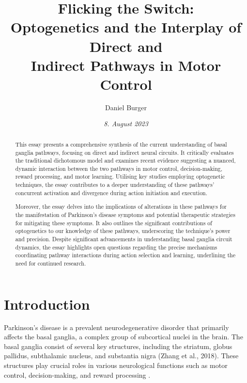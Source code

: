 \documentclass[10pt]{article}
\title{\textbf{Flicking the Switch: } \\ Optogenetics and the Interplay of Direct and \\ Indirect Pathways in Motor Control}
\author[ ]{Daniel Burger}
\affil[ ]{\textbf{King’s College London}}
\affil[ ]{\href{mailto:public@danielburger.online}{public@danielburger.online}}
\date{\textit{8. August 2023}}
\begin{document}

\maketitle
\thispagestyle{empty}


\begin{sloppypar} %
  \begin{abstract}
    This essay presents a comprehensive synthesis of the current understanding of basal ganglia pathways, focusing on direct and indirect neural circuits. It critically evaluates the traditional dichotomous model and examines recent evidence suggesting a nuanced, dynamic interaction between the two pathways in motor control, decision-making, reward processing, and motor learning. Utilising key studies employing optogenetic techniques, the essay contributes to a deeper understanding of these pathways’ concurrent activation and divergence during action initiation and execution.

    Moreover, the essay delves into the implications of alterations in these pathways for the manifestation of Parkinson’s disease symptoms and potential therapeutic strategies for mitigating these symptoms. It also outlines the significant contributions of optogenetics to our knowledge of these pathways, underscoring the technique’s power and precision. Despite significant advancements in understanding basal ganglia circuit dynamics, the essay highlights open questions regarding the precise mechanisms coordinating pathway interactions during action selection and learning, underlining the need for continued research.
  \end{abstract}
  \pagebreak

  \tableofcontents
  \pagebreak

  \listoffigures
  \pagebreak



  \section{Introduction}
  \label{sec:introduction}

  Parkinson’s disease is a prevalent neurodegenerative disorder that primarily affects the basal ganglia, a complex group of subcortical nuclei in the brain. The basal ganglia consist of several key structures, including the striatum, globus pallidus, subthalamic nucleus, and substantia nigra (Zhang et al., 2018). These structures play crucial roles in various neurological functions such as motor control, decision-making, and reward processing \citep{zhang_oculomotor_2018,ojagbemi_neuropsychiatric_2013}.


\end{sloppypar}
\end{document}
